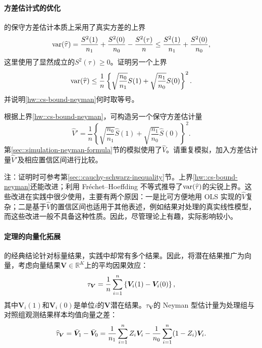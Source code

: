 \paragraph{方差估计式的优化}
\label{hw::better-bound-neyman}


\cite{Neyman:1923}的保守方差估计本质上采用了真实方差的上界
$$
\textup{var}(\widehat{\tau}) = \frac{S^2(1)}{n_1} + \frac{S^2(0)}{n_0} - \frac{S^2(\tau)}{n} \leq \frac{S^2(1)}{n_1} + \frac{S^2(0)}{n_0},
$$
这里使用了显然成立的$S^2(\tau) \geq 0$。证明另一个上界
\begin{eqnarray}\label{hw::cs-bound-neyman}
\textup{var}(\widehat{\tau})  \leq   \frac{1}{n} \left\{   \sqrt{  \frac{n_0}{n_1}  } S(1) +  \sqrt{  \frac{n_1}{n_0}  } S(0)   \right\}^2.
\end{eqnarray}
并说明\eqref{hw::cs-bound-neyman}何时取等号。 

根据上界\eqref{hw::cs-bound-neyman}，可构造另一个保守方差估计量
$$
\hat{V}' =  \frac{1}{n} \left\{   \sqrt{  \frac{n_0}{n_1}  } \hat S(1) +  \sqrt{  \frac{n_1}{n_0}  } \hat S(0)   \right\}^2.
$$
第\ref{sec::simulation-neyman-formula}节的模拟使用了$\hat{V}$。请重复模拟，加入方差估计量$\hat{V}' $及相应置信区间进行比较。 



注：证明时可参考第\ref{sec::cauchy-schwarz-inequality}节。上界\eqref{hw::cs-bound-neyman}还能改进；\citet{aronow2014sharp}利用 Fréchet--Hoeffding 不等式推导了$\textup{var}(\widehat{\tau}) $的尖锐上界。这些改进在实践中很少使用，主要有两个原因：一是比可方便地用 OLS 实现的$\hat{V}$复杂；二是基于$\hat{V}$的置信区间也适用于其他表述，例如结果对处理的真实线性模型，而这些改进一般不具备这种性质。因此，尽管理论上有趣，实际影响较小。 
 


\paragraph{\citet{Neyman:1923}定理的向量化拓展} \label{hw::vector-neyman1923}

\citet{Neyman:1923}的经典结论针对标量结果，实践中却常有多个结果。因此，将潜在结果推广为向量，考虑向量结果$\bm{V}  \in \mathbb{R}^K$上的平均因果效应：
$$
\tau_{\bm{V}} = \frac{1}{n}  \sum_{i=1}^n \left\{  \bm{V}_i(1) - \bm{V}_i(0) \right\},
$$
其中$\bm{V}_i(1)$和$\bm{V}_i(0)$是单位$i$的$\bm{V}$潜在结果。$\tau_{\bm{V}}$的 Neyman 型估计量为处理组与对照组观测结果样本均值向量之差：
$$
\widehat{ \tau}_{\bm{V}} = \bar{\bm{V}}_1  - \bar{\bm{V}}_0 
= \frac{1}{n_1}   \sum_{i=1}^n Z_i  \bm{V}_i   - \frac{1}{n_0}  \sum_{i=1}^n (1-Z_i) \bm{V}_i . 
$$


